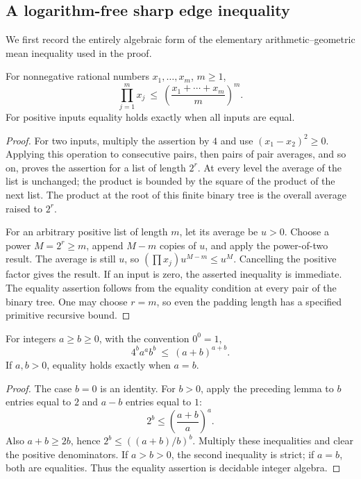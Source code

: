 \subsection{A logarithm-free sharp edge inequality}

We first record the entirely algebraic form of the elementary
arithmetic--geometric mean inequality used in the proof.

\begin{lemma}[Finite AM--GM]
For nonnegative rational numbers \(x_1,\ldots,x_m\), \(m\geq1\),
\[
 \prod_{j=1}^{m}x_j\ \leq\
 \left(\frac{x_1+\cdots+x_m}{m}\right)^m.
\]
For positive inputs equality holds exactly when all inputs are equal.
\end{lemma}
\begin{proof}
For two inputs, multiply the assertion by \(4\) and use
\((x_1-x_2)^2\geq0\).  Applying this operation to consecutive pairs,
then pairs of pair averages, and so on, proves the assertion for a list
of length \(2^r\).  At every level the average of the list is unchanged;
the product is bounded by the square of the product of the next list.
The product at the root of this finite binary tree is the overall average
raised to \(2^r\).

For an arbitrary positive list of length \(m\), let its average be \(u>0\).
Choose a power \(M=2^r\geq m\), append \(M-m\) copies of \(u\), and
apply the power-of-two result.  The average is still \(u\), so
\((\prod x_j)u^{M-m}\leq u^M\).  Cancelling the positive factor gives
the result.  If an input is zero, the asserted inequality is immediate.
The equality assertion follows from the equality condition at every pair
of the binary tree.  One may choose \(r=m\), so even the padding length
has a specified primitive recursive bound.
\end{proof}

\begin{lemma}\label{lem:cube-split}
For integers \(a\geq b\geq0\), with the convention \(0^0=1\),
\begin{equation}\label{eq:cube-split}
 4^b a^a b^b\ \leq\ (a+b)^{a+b}.
\end{equation}
If \(a,b>0\), equality holds exactly when \(a=b\).
\end{lemma}
\begin{proof}
The case \(b=0\) is an identity.  For \(b>0\), apply the preceding lemma
to \(b\) entries equal to \(2\) and \(a-b\) entries equal to \(1\):
\[
 2^b\leq\left(\frac{a+b}{a}\right)^a.
\]
Also \(a+b\geq2b\), hence \(2^b\leq((a+b)/b)^b\).
Multiply these inequalities and clear the positive denominators.
If \(a>b>0\), the second inequality is strict; if \(a=b\), both are
equalities.  Thus the equality assertion is decidable integer algebra.
\end{proof}

